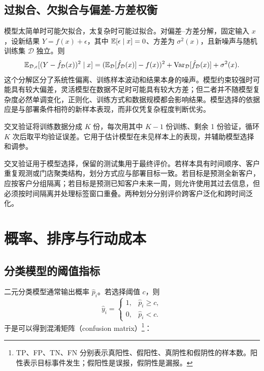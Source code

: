 \subsection{过拟合、欠拟合与偏差-方差权衡}

模型太简单时可能欠拟合，太复杂时可能过拟合。对偏差--方差分解，固定输入 \(x\)，设新结果 \(Y=f(x)+\epsilon\)，其中 \(\mathbb E[\epsilon\mid x]=0\)、方差为 \(\sigma^2(x)\)，且新噪声与随机训练集 \(\mathcal D\) 独立。则
\[
  \mathbb E_{\mathcal D,\epsilon}[(Y-\hat f_{\mathcal D}(x))^2\mid x]
  =
  (\mathbb E_{\mathcal D}[\hat f_{\mathcal D}(x)]-f(x))^2
  +
  \operatorname{Var}_{\mathcal D}[\hat f_{\mathcal D}(x)]
  +
  \sigma^2(x).
\]
这个分解区分了系统性偏离、训练样本波动和结果本身的噪声。模型约束较强时可能具有较大偏差，灵活模型在数据不足时可能具有较大方差；但二者并不随模型复杂度必然单调变化，正则化、训练方式和数据规模都会影响结果。模型选择的依据应是与部署条件相符的新样本表现，而非仅凭复杂程度判断优劣。

\begin{definition}[交叉验证]
交叉验证将训练数据分成 \(K\) 份，每次用其中 \(K-1\) 份训练、剩余 1 份验证，循环 \(K\) 次后取平均验证误差。它用于估计模型在未见样本上的表现，并辅助模型选择和调参。
\end{definition}

交叉验证用于模型选择，保留的测试集用于最终评价。若样本具有时间顺序、客户重复观测或门店聚类结构，划分方式应与部署目标一致。若目标是预测全新客户，应按客户分组隔离；若目标是预测已知客户未来一周，则允许使用其过去信息，但必须按时间隔离并处理标签窗口重叠。两种划分分别评价跨客户泛化和跨时间泛化。

\section{概率、排序与行动成本}
\subsection{分类模型的阈值指标}

二元分类模型通常输出概率 \(\hat p_i\)。若选择阈值 \(c\)，则
\[
  \hat y_i=
  \begin{cases}
    1,& \hat p_i\ge c,\\
    0,& \hat p_i<c.
  \end{cases}
\]
于是可以得到混淆矩阵（confusion matrix）\footnote{TP、FP、TN、FN 分别表示真阳性、假阳性、真阴性和假阴性的样本数。阳性表示目标事件发生；假阳性是误报，假阴性是漏报。}：

